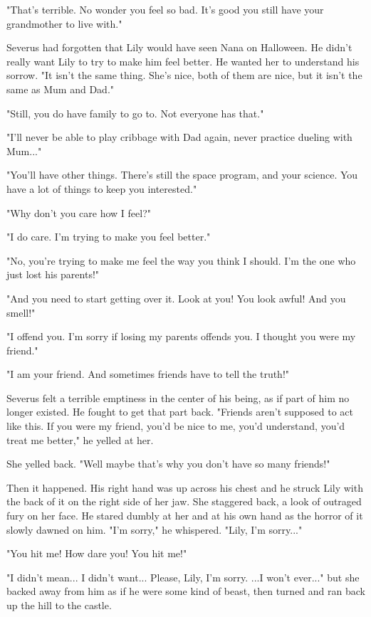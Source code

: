 \documentclass[a4paper,11pt]{article}
\begin{document}
"That's terrible. No wonder you feel so bad. It's good you still have your grandmother to live with."

Severus had forgotten that Lily would have seen Nana on Halloween. He didn't really want Lily to try to make him feel better. He wanted her to understand his sorrow. "It isn't the same thing. She's nice, both of them are nice, but it isn't the same as Mum and Dad."

"Still, you do have family to go to. Not everyone has that."

"I'll never be able to play cribbage with Dad again, never practice dueling with Mum..."

"You'll have other things. There's still the space program, and your science. You have a lot of things to keep you interested."

"Why don't you care how I feel?"

"I do care. I'm trying to make you feel better."

"No, you're trying to make me feel the way you think I should. I'm the one who just lost his parents!"

"And you need to start getting over it. Look at you! You look awful! And you smell!"

"I offend you. I'm sorry if losing my parents offends you. I thought you were my friend."

"I am your friend. And sometimes friends have to tell the truth!"

Severus felt a terrible emptiness in the center of his being, as if part of him no longer existed. He fought to get that part back. "Friends aren't supposed to act like this. If you were my friend, you'd be nice to me, you'd understand, you'd treat me better," he yelled at her.

She yelled back. "Well maybe that's why you don't have so many friends!"

Then it happened. His right hand was up across his chest and he struck Lily with the back of it on the right side of her jaw. She staggered back, a look of outraged fury on her face. He stared dumbly at her and at his own hand as the horror of it slowly dawned on him. "I'm sorry," he whispered. "Lily, I'm sorry..."

"You hit me! How dare you! You hit me!"

"I didn't mean... I didn't want... Please, Lily, I'm sorry. ...I won't ever..." but she backed away from him as if he were some kind of beast, then turned and ran back up the hill to the castle.
\end{document}
